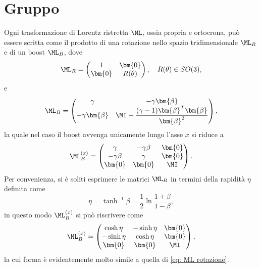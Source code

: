 \section{Gruppo \texorpdfstring{}{SO(1,3)}}
Ogni trasformazione di Lorentz ristretta $\ML$, ossia propria e ortocrona, può essere scritta come il prodotto di una rotazione nello spazio tridimensionale $\ML_R$ e di un boost $\ML_B$, dove 
\begin{equation}
\label{eq: ML rotazione}
    \ML_R = 
    \begin{pmatrix}
        1 & \bm{0} \\
        \bm{0} & R(\theta)
    \end{pmatrix},\quad R(\theta)\in SO(3),
\end{equation}
e
\begin{equation}
\label{eq: ML boost}
    \ML_B = 
    \begin{pmatrix}
        \gamma & -\gamma\bm{\beta} \\
        -\gamma\bm{\beta} & \MI + \dfrac{(\gamma -1 )\bm{\beta}^T\bm{\beta}}{\bm{\beta}^2}
    \end{pmatrix},
\end{equation}
la quale nel caso il boost avvenga unicamente lungo l'asse $x$ si riduce a
\begin{equation}
    \ML_B^{(x)} =
    \begin{pmatrix}
        \gamma & -\gamma\beta & \bm{0} \\
        -\gamma\beta & \gamma & \bm{0} \\
        \bm{0} & \bm{0} & \MI
    \end{pmatrix}.
\end{equation}
Per convenienza, si è soliti esprimere le matrici $\ML_B$ in termini della rapidità $\eta$ definita come
\begin{equation}
    \eta = \tanh^{-1}{\beta} = \frac{1}{2}\ln{\frac{1 + \beta}{1 - \beta}},
\end{equation}
in questo modo $\ML_B^{(x)}$ si può riscrivere come
\begin{equation}
    \ML_B^{(x)} = 
    \begin{pmatrix}
        \cosh{\eta} & -\sinh{\eta} & \bm{0} \\
        -\sinh{\eta} & \cosh{\eta} & \bm{0} \\
        \bm{0} & \bm{0} & \MI
    \end{pmatrix},
\end{equation}
la cui forma è evidentemente molto simile a quella di \eqref{eq: ML rotazione}. 
